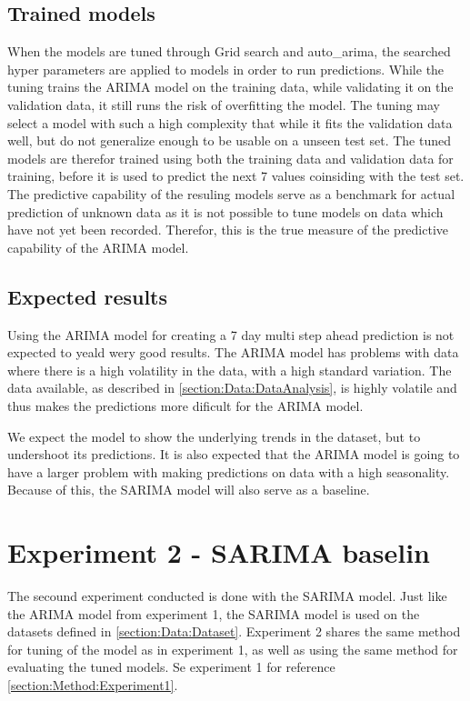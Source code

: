   \subsection{Trained models}
  When the models are tuned through Grid search and auto\_arima,
  the searched hyper parameters are applied to models in order to run predictions.
  While the tuning trains the ARIMA model on the training data, while validating it on the validation data,
  it still runs the risk of overfitting the model.
  The tuning may select a model with such a high complexity that while it fits the validation data well,
  but do not generalize enough to be usable on a unseen test set.
  The tuned models are therefor trained using both the training data and validation data for training,
  before it is used to predict the next 7 values coinsiding with the test set.
  The predictive capability of the resuling models serve as a benchmark for actual prediction
  of unknown data as it is not possible to tune models on data which have not yet been recorded.
  Therefor, this is the true measure of the predictive capability of the ARIMA model.


  \subsection{Expected results}

  Using the ARIMA model for creating a 7 day multi step ahead prediction is not expected to yeald wery good results.
  The ARIMA model has problems with data where there is a high volatility in the data, with a high standard variation.
  The data available, as described in \cref{section:Data:DataAnalysis},
  is highly volatile and thus makes the predictions more dificult for the ARIMA model.

  We expect the model to show the underlying trends in the dataset, but to
  undershoot its predictions.
  It is also expected that the ARIMA model is going to have a larger problem with making predictions on data with a high seasonality.
  Because of this, the SARIMA model will also serve as a baseline.


  \section{Experiment 2 - SARIMA baselin}
  \label{section:Method:Experiment2}

  The secound experiment conducted is done with the SARIMA model.
  Just like the ARIMA model from experiment 1, the SARIMA model is used on the datasets defined in \cref{section:Data:Dataset}.
  Experiment 2 shares the same method for tuning of the model as in experiment 1,
  as well as using the same method for evaluating the tuned models.
  Se experiment 1 for reference \cref{section:Method:Experiment1}.


